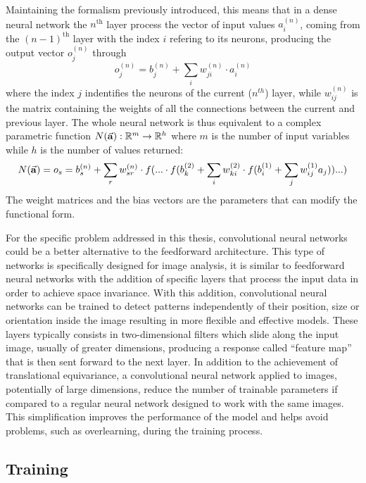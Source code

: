 \documentclass[a4paper,10pt]{report}
\begin{document}
Maintaining the formalism previously introduced, this means that in a dense 
neural network the $n^{\text{th}}$ layer process the vector of input values 
$a_i^{(n)}$, coming from the $(n-1)^{\text{th}}$ layer with the index $i$ refering to its neurons, producing the output vector $o_j^{(n)}$ through
\begin{equation}
    o_j^{(n)} = b_j^{(n)} + \sum_i w^{(n)}_{ji}\cdot a^{(n)}_i
\end{equation}
where the index $j$ indentifies the neurons of the current ($n^{th}$) layer, while
 $w^{(n)}_{ij}$ is the matrix containing the weights of all the connections between the current and previous layer.
The whole neural network is thus equivalent to a complex parametric function $N (\va a): \mathbb{R}^m \rightarrow \mathbb{R}^h$ where $m$ is 
the number of input variables while $h$ is the number of values returned:
\begin{equation}
    N(\va a) = o_s = b_s^{(n)} + \sum_r w^{(n)}_{sr} 
    \cdot f( ... \cdot f( b_k^{(2)} + \sum_i w_{ki}^{(2)} \cdot f(b_i^{(1)} + \sum_j w_{ij}^{(1)}a_j)) ... )
\end{equation}
The weight matrices and the bias vectors are the parameters that can modify the functional form.

For the specific problem addressed in this thesis, convolutional neural networks could be a better alternative 
to the feedforward architecture.
This type of networks is specifically designed for image analysis, 
it is similar to feedforward neural networks with the addition
of specific layers that process the input data in order to achieve 
space invariance. With this addition, convolutional neural networks can be trained
to detect patterns independently of their position, size or orientation inside the image
resulting in more flexible and effective models.
These layers typically consists in two-dimensional filters which slide along the input image, usually of greater dimensions, 
producing a response called ``feature map'' that is then sent forward to the next layer.
In addition to the achievement of translational equivariance, a convolutional neural network
applied to images, potentially of large dimensions, reduce the number of trainable parameters
if compared to a regular neural network designed to work with the same images. This simplification improves the
performance of the model and helps avoid problems, such as overlearning, during the training process.

\subsection{Training}
\end{document}
